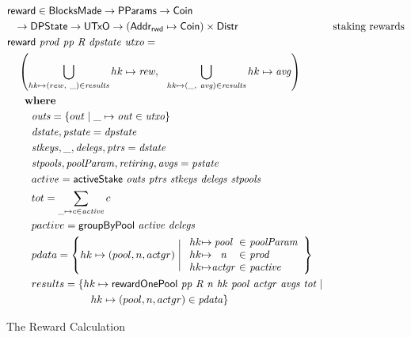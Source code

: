 \begin{figure}[htb]
\begin{align*}
      \nextdef
      & \fun{reward} \in \BlocksMade \to \PParams \to \Coin \\
      & ~~ \to \DPState \to \UTxO \to (\AddrRWD \mapsto \Coin)\times\Distr
      & \text{staking rewards} \\
      & \fun{reward}~\var{prod}~\var{pp}~\var{R}~\var{dpstate}~\var{utxo} = \\
      & ~~~\left(
           \bigcup_{hk\mapsto(rew,~\_)\in\var{results}} hk\mapsto\var{rew},
           ~~\bigcup_{hk\mapsto(\_,~\var{avg})\in\var{results}} hk\mapsto\var{avg}
           \right)\\
      & ~~~\where \\
      & ~~~~~~~\var{outs} = \{out\mid\_\mapsto\var{out}\in\var{utxo}\} \\
      & ~~~~~~~\var{dstate},\var{pstate} = \var{dpstate} \\
      & ~~~~~~~\var{stkeys},\_,\var{delegs},\var{ptrs} = \var{dstate} \\
      & ~~~~~~~\var{stpools},\var{poolParam},\var{retiring},\var{avgs} = \var{pstate} \\
      & ~~~~~~~active = \activeStake{outs}{ptrs}{stkeys}{delegs}{stpools} \\
      & ~~~~~~~tot = \sum_{\_\mapsto c\in \var{active}}c \\
      & ~~~~~~~pactive = \fun{groupByPool}~\var{active}~\var{delegs} \\
      & ~~~~~~~pdata = \left\{
                         hk\mapsto (pool, n, actgr)  \mathrel{\Bigg|}
                          \begin{array}{r@{\mapsto}c@{~\in~}l}
                          hk & \var{pool} & \var{poolParam} \\
                          hk & \var{n} & \var{prod} \\
                          hk & \var{actgr} & \var{pactive} \\
                          \end{array}
                       \right\} \\
      & ~~~~~~~results = \{hk \mapsto \fun{rewardOnePool}~\var{pp}~\var{R}~\var{n}~\var{hk}
      ~\var{pool}~\var{actgr}~\var{avgs}~\var{tot}
                         \mid \\
      &\qquad \qquad \qquad \qquad hk\mapsto(pool, n, actgr)\in\var{pdata} \}
  \end{align*}
  \caption{The Reward Calculation}
  \label{fig:functions:reward-calc}
\end{figure}

